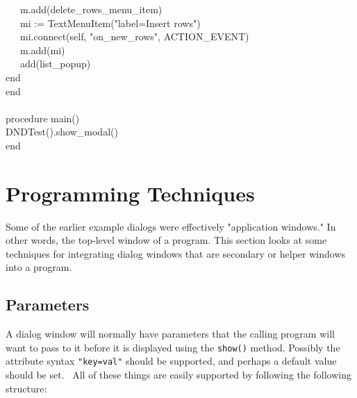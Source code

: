 {\>   \ \ \ m.add(delete\_rows\_menu\_item) \\
\>   \ \ \ mi := TextMenuItem("label=Insert
rows") \\
\>   \ \ \ mi.connect(self,
"on\_new\_rows", ACTION\_EVENT) \\
\>   \ \ \ m.add(mi) \\
\>   \ \ \ add(list\_popup) \\
\>   end \\
end \\
\ \\
procedure main() \\
\>   DNDTest().show\_modal() \\
end
}

\section{Programming Techniques}

Some of the earlier example dialogs were effectively
"application windows." In other words, the
top-level window of a program. This section looks at some techniques
for integrating dialog windows that are secondary or helper windows
into a program.

\subsection{Parameters}

A dialog window will normally have parameters that the calling program will want
to pass to it before it is displayed using the \texttt{show()} method. Possibly
the attribute syntax \texttt{"key=val"} should be
supported, and perhaps a default value should be set. \ All of these things are
easily supported by following the following structure:

